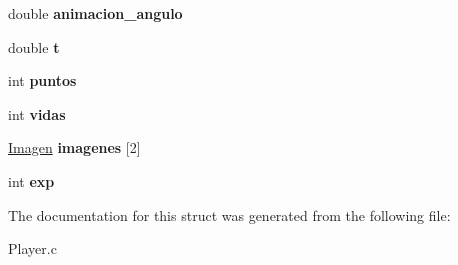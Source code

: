 \begin{DoxyCompactItemize}
\mbox{\label{struct_player_rep_a1da89b72f4e94b483293f1c6118fe049}} 
double {\bfseries animacion\+\_\+angulo}
\item 
\mbox{\label{struct_player_rep_a846e57cf82bca73fb84f2b16ac2a889c}} 
double {\bfseries t}
\item 
\mbox{\label{struct_player_rep_a5f2fe9ab2b9c4655573c5f2ff18f98a6}} 
int {\bfseries puntos}
\item 
\mbox{\label{struct_player_rep_a7684ba0122135fdb45d04b318e9e5607}} 
int {\bfseries vidas}
\item 
\mbox{\label{struct_player_rep_a69aa2cf42ba1b8842981777ea4d0df5f}} 
\mbox{\hyperlink{_pantalla_8h_a768e3409329f2389c63495f1a1684379}{Imagen}} {\bfseries imagenes} \mbox{[}2\mbox{]}
\item 
\mbox{\label{struct_player_rep_a879577cbcb0455106ce976a9776f8160}} 
int {\bfseries exp}
\end{DoxyCompactItemize}


The documentation for this struct was generated from the following file\+:\begin{DoxyCompactItemize}
\item 
Player.\+c\end{DoxyCompactItemize}
